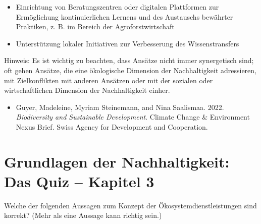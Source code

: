 \documentclass[
  nswissgerman,
  a4paper,
  openany]{book}
\providecommand{\tightlist}{%
  \setlength{\itemsep}{0pt}\setlength{\parskip}{0pt}}
\begin{document}
\begin{itemize}
\item
  Einrichtung von Beratungszentren oder digitalen Plattformen zur
  Ermöglichung kontinuierlichen Lernens und des Austauschs bewährter
  Praktiken, z. B. im Bereich der Agroforstwirtschaft
\item
  Unterstützung lokaler Initiativen zur Verbesserung des
  Wissenstransfers
\end{itemize}

Hinweis: Es ist wichtig zu beachten, dass Ansätze nicht immer
synergetisch sind; oft gehen Ansätze, die eine ökologische Dimension der
Nachhaltigkeit adressieren, mit Zielkonflikten mit anderen Ansätzen oder
mit der sozialen oder wirtschaftlichen Dimension der Nachhaltigkeit
einher.

\begin{tcolorbox}[enhanced jigsaw, arc=.35mm, bottomrule=.15mm, bottomtitle=1mm, breakable, colback=white, colbacktitle=quarto-callout-caution-color!10!white, colframe=quarto-callout-caution-color-frame, coltitle=black, left=2mm, leftrule=.75mm, opacityback=0, opacitybacktitle=0.6, rightrule=.15mm, title={Weiterführende Literatur}, titlerule=0mm, toprule=.15mm, toptitle=1mm]

\begin{itemize}
\tightlist
\item
  Guyer, Madeleine, Myriam Steinemann, and Nina Saalismaa. 2022.
  \emph{Biodiversity and Sustainable Development}. Climate Change \&
  Environment Nexus Brief. Swiss Agency for Development and Cooperation.
\end{itemize}

\end{tcolorbox}

\section{Grundlagen der Nachhaltigkeit: Das Quiz -- Kapitel
3}\label{grundlagen-der-nachhaltigkeit-das-quiz-kapitel-3}

Welche der folgenden Aussagen zum Konzept der Ökosystemdienstleistungen
sind korrekt? (Mehr als eine Aussage kann richtig sein.)
\end{document}
